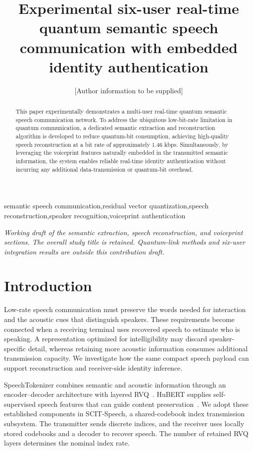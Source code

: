 \documentclass[final,5p,times,twocolumn]{elsarticle}
\begin{document}
\begin{frontmatter}
\title{Experimental six-user real-time quantum semantic speech communication with embedded identity authentication}
\author{[Author information to be supplied]}
\begin{abstract}
This paper experimentally demonstrates a multi-user real-time quantum semantic speech communication network. To address the ubiquitous low-bit-rate limitation in quantum communication, a dedicated semantic extraction and reconstruction algorithm is developed to reduce quantum-bit consumption, achieving high-quality speech reconstruction at a bit rate of approximately 1.46 kbps. Simultaneously, by leveraging the voiceprint features naturally embedded in the transmitted semantic information, the system enables reliable real-time identity authentication without incurring any additional data-transmission or quantum-bit overhead.
\end{abstract}
\begin{keyword}
semantic speech communication\sep residual vector quantization\sep speech reconstruction\sep speaker recognition\sep voiceprint authentication
\end{keyword}
\end{frontmatter}

\noindent\textit{Working draft of the semantic extraction, speech reconstruction, and voiceprint sections. The overall study title is retained. Quantum-link methods and six-user integration results are outside this contribution draft.}

\section{Introduction}
Low-rate speech communication must preserve the words needed for interaction and the acoustic cues that distinguish speakers. These requirements become connected when a receiving terminal uses recovered speech to estimate who is speaking. A representation optimized for intelligibility may discard speaker-specific detail, whereas retaining more acoustic information consumes additional transmission capacity. We investigate how the same compact speech payload can support reconstruction and receiver-side identity inference.

SpeechTokenizer combines semantic and acoustic information through an encoder--decoder architecture with layered RVQ~\cite{speechtokenizer}. HuBERT supplies self-supervised speech features that can guide content preservation~\cite{hubert}. We adopt these established components in SCIT-Speech, a shared-codebook index transmission subsystem. The transmitter sends discrete indices, and the receiver uses locally stored codebooks and a decoder to recover speech. The number of retained RVQ layers determines the nominal index rate.
\end{document}
